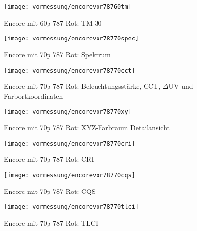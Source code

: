 \documentclass[pagesize,paper=A4,fontsize=12pt,utf8,numbers=noenddot,bibliography=totoc,listof=totoc,DIV=11,BCOR=1mm]{scrreprt}
\begin{document}
\begin{figure}[htp]     %
\centering
\texttt{[image: vormessung/encorevor78760tm]} 
\caption {Encore mit 60p 787 Rot: TM-30} 
\end{figure}




\begin{figure}[htp]     %
\centering
\texttt{[image: vormessung/encorevor78770spec]} 
\caption {Encore mit 70p 787 Rot: Spektrum} 
\end{figure}

\begin{figure}[htp]     %
\centering
\texttt{[image: vormessung/encorevor78770cct]} 
\caption {Encore mit 70p 787 Rot: Beleuchtungsstärke, CCT, $\Delta$UV und Farbortkoordinaten} 
\end{figure}

\begin{figure}[htp]     %
\centering
\texttt{[image: vormessung/encorevor78770xy]} 
\caption {Encore mit 70p 787 Rot: XYZ-Farbraum Detailansicht} 
\end{figure}

\begin{figure}[htp]     %
\centering
\texttt{[image: vormessung/encorevor78770cri]} 
\caption {Encore mit 70p 787 Rot: CRI} 
\end{figure}

\begin{figure}[htp]     %
\centering
\texttt{[image: vormessung/encorevor78770cqs]} 
\caption {Encore mit 70p 787 Rot: CQS} 
\end{figure}

\begin{figure}[htp]     %
\centering
\texttt{[image: vormessung/encorevor78770tlci]} 
\caption {Encore mit 70p 787 Rot: TLCI} 
\end{figure}
\end{document}
